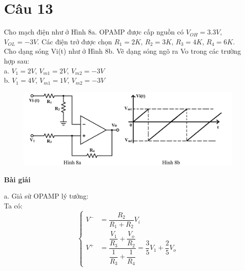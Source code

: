 \section{Câu 13}
Cho mạch điện như ở Hình 8a. OPAMP được cấp nguồn có $V_{OH}=3.3V$, $V_{OL}=-3V$.
Các điện trở được chọn $R_1=2K$, $R_2=3K$, $R_3=4K$, $R_4=6K$.\\
Cho dạng sóng Vi(t) như ở Hình 8b. Vẽ dạng sóng ngõ ra Vo trong các trường hợp sau:\\
a. $V_1=2V$, $V_{m1}=2V$, $V_{m2}=-3V$\\
b. $V_1=4V$, $V_{m1}=1V$, $V_{m2}=-3V$
\begin{figure}[H]
	\centering
	\includegraphics[scale=0.9]{image/C13_De.png}
\end{figure}
\begin{center}
\textbf{Bài giải}
\end{center}
a. Giả sử OPAMP lý tưởng:\\
Ta có:
\[
\left\{
\begin{aligned}
V^- &= \dfrac{R_2}{R_1+R_2}V_i \\
V^+ &= \dfrac{\dfrac{V_1}{R_3} + \dfrac{V_o}{R_2}}{\dfrac{1}{R_3} + \dfrac{1}{R_4}} = \dfrac{3}{5}V_1 +\dfrac{2}{5}V_o
\end{aligned}
\right.
\]

